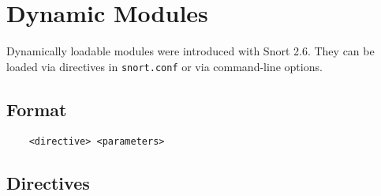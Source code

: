 \documentclass[english]{report}
\begin{document}
\section{Dynamic Modules}

Dynamically loadable modules were introduced with Snort 2.6.  They can be
loaded via directives in \texttt{snort.conf} or via command-line options.

\subsection{Format}

\begin{verbatim}
    <directive> <parameters>
\end{verbatim}

\subsection{Directives}
\end{document}
